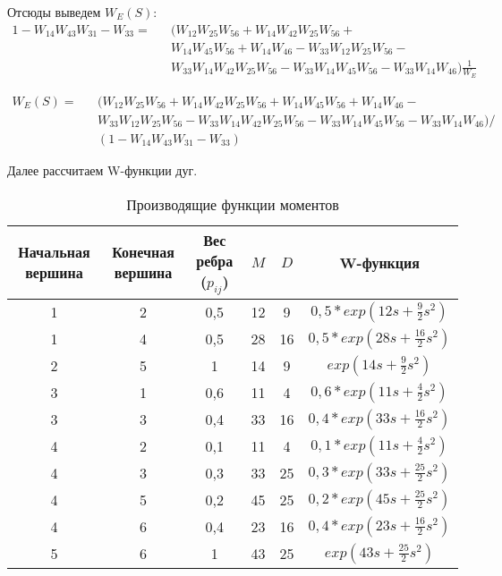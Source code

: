 Отсюды выведем $W_E(S)$:
\begin{eqnarray*}
	1 - W_{14}W_{43}W_{31} - W_{33} = && (W_{12}W_{25}W_{56} + W_{14}W_{42}W_{25}W_{56} + \\
	&& W_{14}W_{45}W_{56} + W_{14}W_{46} - W_{33}W_{12}W_{25}W_{56} - \\
	&& W_{33}W_{14}W_{42}W_{25}W_{56} - W_{33}W_{14}W_{45}W_{56} - W_{33}W_{14}W_{46})\frac{1}{W_E}
\end{eqnarray*}

\begin{eqnarray*}
	W_E(S) = && (W_{12}W_{25}W_{56} + W_{14}W_{42}W_{25}W_{56} + W_{14}W_{45}W_{56} + W_{14}W_{46} - \\
	&&W_{33}W_{12}W_{25}W_{56} - W_{33}W_{14}W_{42}W_{25}W_{56} - W_{33}W_{14}W_{45}W_{56} - W_{33}W_{14}W_{46})/ \\
	&&(1 - W_{14}W_{43}W_{31} - W_{33})
\end{eqnarray*}

Далее рассчитаем W-функции дуг.

\begin{table}[htb]
\centering
	\begin{tabular}{|c|c|c|c|c|c|}
	\hline 
	Начальная вершина & Конечная вершина & Вес ребра ($p_{ij}$) & $M$ & $D$ & W-функция \\ 
	\hline 
	1 & 2 & 0,5 & 12 & 9 & $0,5*exp(12s+\frac{9}{2}s^2)$ \\ 
	\hline 
	1 & 4 & 0,5 & 28 & 16 & $0,5*exp(28s+\frac{16}{2}s^2)$ \\ 
	\hline 
	2 & 5 & 1 & 14 & 9 & $exp(14s+\frac{9}{2}s^2)$ \\ 
	\hline 
	3 & 1 & 0,6 & 11 & 4 & $0,6*exp(11s+\frac{4}{2}s^2)$ \\ 
	\hline 
	3 & 3 & 0,4 & 33 & 16 & $0,4*exp(33s+\frac{16}{2}s^2)$ \\ 
	\hline 
	4 & 2 & 0,1 & 11 & 4 & $0,1*exp(11s+\frac{4}{2}s^2)$ \\ 
	\hline 
	4 & 3 & 0,3 & 33 & 25 & $0,3*exp(33s+\frac{25}{2}s^2)$ \\ 
	\hline 
	4 & 5 & 0,2 & 45 & 25 & $0,2*exp(45s+\frac{25}{2}s^2)$ \\ 
	\hline 
	4 & 6 & 0,4 & 23 & 16 & $0,4*exp(23s+\frac{16}{2}s^2)$ \\ 
	\hline 
	5 & 6 & 1 & 43 & 25 & $exp(43s+\frac{25}{2}s^2)$ \\ 
	\hline 
	\end{tabular} 
\caption{Производящие функции моментов}
\end{table}

